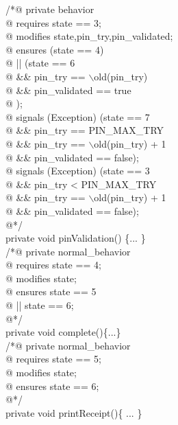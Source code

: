 \begin{figure}[h]
\begin{multicols}{2}
\begin{scriptsize}
            /*@ private behavior\\
\quad         @ requires state == 3;\\
\quad         @ modifies state,pin\_try,pin\_validated;\\
\quad         @ ensures (state == 4)\\
\quad         @  \quad     || (state == 6\\
\quad         @  \qquad         \&\& pin\_try == $\backslash$old(pin\_try)\\
\quad         @  \qquad         \&\& pin\_validated == true\\
\quad         @  \qquad         );\\
\quad         @ signals (Exception) (state == 7 \\
\quad         @  \qquad        \&\& pin\_try == PIN\_MAX\_TRY\\
\quad         @  \qquad        \&\& pin\_try == $\backslash$old(pin\_try) + 1\\
\quad         @  \qquad        \&\& pin\_validated == false);\\
\quad         @ signals (Exception) (state == 3 \\
\quad         @  \qquad        \&\& pin\_try < PIN\_MAX\_TRY\\
\quad         @  \qquad        \&\& pin\_try == $\backslash$old(pin\_try) + 1\\
\quad         @  \qquad        \&\& pin\_validated == false);\\
\quad         @*/\\
            private void pinValidation() \{... \}\\
            
            
            /*@ private  normal\_behavior\\
\quad         @ requires state == 4;\\
\quad         @ modifies state;\\
\quad         @ ensures state == 5\\
\quad         @ \qquad      || state == 6;\\
\quad         @*/\\
            private void complete()\{...\}\\
            
            
            /*@ private  normal\_behavior\\
\quad         @ requires state == 5;\\
\quad         @ modifies state;\\
\quad         @ ensures state == 6;\\
\quad         @*/\\
            private void printReceipt()\{ ... \}\\


\end{scriptsize}
\end{multicols}
\end{figure}
